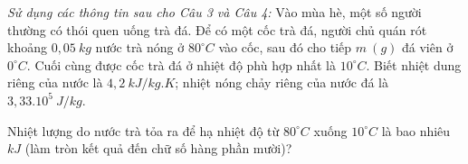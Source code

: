 \textit{Sử dụng các thông tin sau cho Câu 3 và Câu 4:} Vào mùa hè, một số người thường có thói quen uống trà đá. Để có một cốc trà đá, người chủ quán rót khoảng $0,05\ kg$ nước trà nóng ở $80^\circ C$ vào cốc, sau đó cho tiếp $m\ (g)$ đá viên ở $0^\circ C$. Cuối cùng được cốc trà đá ở nhiệt độ phù hợp nhất là $10^\circ C$. Biết nhiệt dung riêng của nước là $4,2\ kJ/kg.K$; nhiệt nóng chảy riêng của nước đá là ${3,33.10}^{5}\ J/kg$.

\begin{ex}
	Nhiệt lượng do nước trà tỏa ra để hạ nhiệt độ từ  $80^\circ C$ xuống  $10^\circ C$ là bao nhiêu $kJ$ (làm tròn kết quả đến chữ số hàng phần mười)?
\end{ex}

